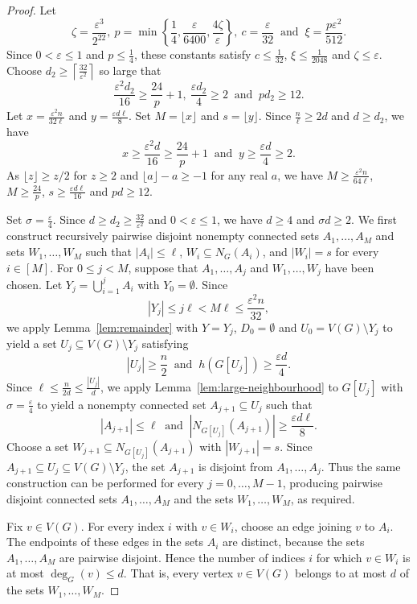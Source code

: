 \documentclass[11pt,a4paper]{article}
\theoremstyle{definition}
\theoremstyle{remark}
\newcommand{\eps}{\varepsilon}
\begin{document}
\begin{proof}
Let
\[
 \zeta=\frac{\eps^3}{2^{22}}, \ 
 p=\min\left\{\frac{1}{4},\frac{\eps}{6400},
                 \frac{4\zeta}{\eps}\right\}, \
 c=\frac{\eps}{32} \ \text{ and } \
 \xi=\frac{p\eps^2}{512}.
\]
Since $0<\eps\le1$ and $p\le\frac{1}{4}$, these constants satisfy
$c\le\frac{1}{32}$, $\xi\le\frac{1}{2048}$ and $\zeta\le\eps$.
Choose
$d_2\ge\left\lceil\frac{32}{\eps^2}\right\rceil$ so large that
\[
 \frac{\eps^2d_2}{16}\ge\frac{24}{p}+1,
 \ \frac{\eps d_2}{4}\ge2 
 \ \text{ and } \ pd_2\ge12.
\]
Let 
$x=\frac{\eps^2n}{32\ell}$ and
$y=\frac{\eps d\ell}{8}$.
Set $M=\lfloor x\rfloor$ and $s=\lfloor y\rfloor$.
Since $\frac{n}{\ell}\ge2d$ and
$d\ge d_2$, we have
\[
 x\ge\frac{\eps^2d}{16}\ge\frac{24}{p}+1
 \ \text{ and } \ 
 y\ge\frac{\eps d}{4}\ge2.
\]
As $\lfloor z\rfloor\ge z/2$ for $z\ge2$ and  $\lfloor a\rfloor-a\ge -1$ for any real $a$, we have
$M\ge\frac{\eps^2n}{64\ell}$, 
$M\ge\frac{24}{p}$, 
$s\ge\frac{\eps d\ell}{16}$  and
$pd\ge 12$.


Set $\sigma=\frac{\eps}{4}$. Since
$d\ge d_2\ge\frac{32}{\eps^2}$ and $0<\eps\le1$, we have
$d\ge4$ and $\sigma d\ge 2$.
We first construct recursively pairwise disjoint nonempty connected sets
$A_1,\ldots,A_M$ and sets $W_1,\ldots,W_M$ such that
$|A_i|\le\ell$, $W_i\subseteq N_G(A_i)$, and $|W_i|=s$
for every $i\in[M]$. 
For $0\le j<M$, 
suppose that
$A_1,\ldots,A_j$ and $W_1,\ldots,W_j$ have been chosen. Let
$Y_j=\bigcup_{i=1}^jA_i$ with $Y_0=\emptyset$. Since
\[
 |Y_j|\le j\ell<M\ell\le\frac{\eps^2n}{32},
\]
we apply Lemma~\ref{lem:remainder} with
$Y=Y_j$, $D_0=\emptyset$ and $U_0=V(G)\setminus Y_j$ to yield  a set
$U_j\subseteq V(G)\setminus Y_j$ satisfying
\[
 |U_j|\ge\frac{n}{2}
 \ \text{ and } \ 
 h(G[U_j])\ge\frac{\eps d}{4}.
\]
Since
$\ell\le\frac{n}{2d}\le\frac{|U_j|}{d}$, we apply
Lemma~\ref{lem:large-neighbourhood} to $G[U_j]$ with
$\sigma=\frac{\eps}{4}$ to yield  a nonempty connected set
$A_{j+1}\subseteq U_j$ such that
\[
 |A_{j+1}|\le\ell
 \ \text{ and } \
 |N_{G[U_j]}(A_{j+1})|\ge\frac{\eps d\ell}{8}.
\]
Choose a set
$W_{j+1}\subseteq N_{G[U_j]}(A_{j+1})$ with $|W_{j+1}|=s$.
Since $A_{j+1}\subseteq U_j\subseteq V(G)\setminus Y_j$, the set
$A_{j+1}$ is disjoint from $A_1,\ldots,A_j$. Thus the same
construction can be performed for every $j=0,\ldots,M-1$, producing
pairwise disjoint connected sets $A_1,\ldots,A_M$ and the 
sets $W_1,\ldots,W_M$, as required.




Fix $v\in V(G)$. For every index $i$ with $v\in W_i$,
choose an edge joining $v$ to $A_i$. The endpoints of these edges in
the sets $A_i$ are distinct, because the sets $A_1,\ldots,A_M$ are
pairwise disjoint. Hence the number of indices $i$ for which
$v\in W_i$ is at most $\deg_G(v)\le d$. That is, every vertex $v \in V(G)$ belongs to at most $d$ of the sets $W_1,\dots,W_M$.


\end{proof}
\end{document}
